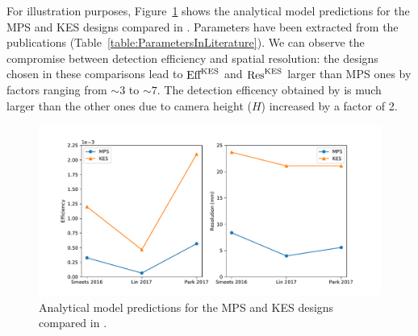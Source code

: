 \documentclass[a4paper,english,12pt]{article}
\begin{document}
For illustration purposes, Figure~\ref{fig:AMpredictions} shows the analytical model predictions for the MPS and KES designs compared in \citep{Smeets2016, Lin2017, Park2017}. Parameters have been extracted from the publications (Table~\ref{table:ParametersInLiterature}). We can observe the compromise between detection efficiency and spatial resolution: the designs chosen in these comparisons lead to $\textrm{Eff}_{}^{\textrm{KES}}$ and $\textrm{Res}_{}^{\textrm{KES}}$ larger than MPS ones by factors ranging from $\sim3$ to $\sim7$. The detection efficency obtained by \cite{Park2017} is much larger than the other ones due to camera height ($H$) increased by a factor of 2. 

\begin{figure}[!htp]
  \centering
	\includegraphics[width=1\linewidth]{./figures/Literature}
  \caption{\label{fig:AMpredictions} Analytical model predictions for the MPS and KES designs compared in \citep{Smeets2016, Lin2017, Park2017}.}
\end{figure} 
\end{document}

